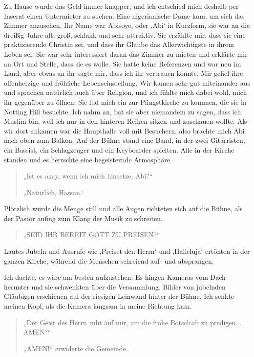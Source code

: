 \documentclass[12pt]{memoir}
\begin{document}
Zu Hause wurde das Geld immer knapper,
und ich entschied mich deshalb per Inserat einen Untermieter zu suchen.
Eine nigerianische Dame kam, um sich das Zimmer anzusehen.
Ihr Name war Abisoye, oder ‚Abi‘ in Kurzform,
sie war an die dreißig Jahre alt, groß, schlank und sehr attraktiv.
Sie erzählte mir, dass sie eine praktizierende Christin sei,
und dass ihr Glaube das Allerwichtigste in ihrem Leben sei.
Sie war sehr interessiert daran das Zimmer zu mieten
und erklärte mir an Ort und Stelle, dass sie es wolle.
Sie hatte keine Referenzen und war neu im Land,
aber etwas an ihr sagte mir, dass ich ihr vertrauen konnte.
Mir gefiel ihre offenherzige und fröhliche Lebenseinstellung.
Wir kamen sehr gut miteinander aus
und sprachen natürlich auch über Religion,
und ich fühlte mich dabei wohl, mich ihr gegenüber zu öffnen.
Sie lud mich ein zur Pfingstkirche zu kommen,
die sie in Notting Hill besuchte.
Ich nahm an, bat sie aber niemandem zu sagen, dass ich Muslim bin,
weil ich nur in den hinteren Reihen sitzen und zuschauen wollte.
Als wir dort ankamen war die Haupthalle voll mit Besuchern,
also brachte mich Abi nach oben zum Balkon.
Auf der Bühne stand eine Band, in der zwei Gitarristen,
ein Bassist, ein Schlagzeuger und ein Keyboarder spielten.
Alle in der Kirche standen und es herrschte eine begeisternde Atmosphäre.

\begin{quote}
„Ist es okay, wenn ich mich hinsetze, Abi?“

„Natürlich, Hassan.“
\end{quote}

Plötzlich wurde die Menge still und alle Augen richteten sich auf die Bühne,
als der Pastor anfing zum Klang der Musik zu schreiten.

\begin{quote}
„SEID IHR BEREIT GOTT ZU PREISEN?“
\end{quote}

Lautes Jubeln und Ausrufe wie ‚Preiset den Herrn‘ und ‚Halleluja‘
ertönten in der ganzen Kirche,
während die Menschen schreiend auf- und absprangen.

Ich dachte, es wäre am besten aufzustehen.
Es hingen Kameras vom Dach herunter und sie schwenkten über die Versammlung.
Bilder von jubelnden Gläubigen erschienen
auf der riesigen Leinwand hinter der Bühne.
Ich senkte meinen Kopf, als die Kamera langsam in meine Richtung kam.

\begin{quote}
„Der Geist des Herrn ruht auf mir,
um die frohe Botschaft zu predigen... AMEN?“

„AMEN!“ erwiderte die Gemeinde.
\end{quote}
\end{document}
